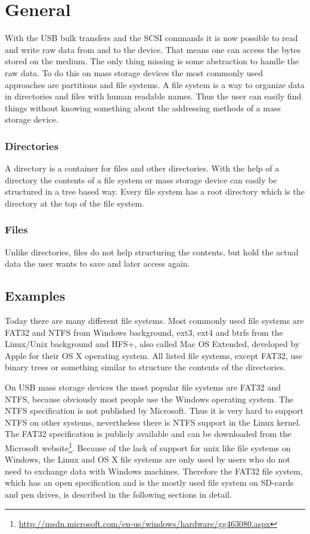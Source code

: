 \section{General}

With the USB bulk transfers and the SCSI commands it is now possible to read and write raw data from and to the device. That means one can access the bytes stored on the medium. The only thing missing is some abstraction to handle the raw data. To do this on mass storage devices the most commonly used approaches are partitions and file systems. A file system is a way to organize data in directories and files with human readable names. Thus the user can easily find things without knowing something about the addressing methods of a mass storage device.

\subsubsection{Directories}

A directory is a container for files and other directories. With the help of a directory the contents of a file system or mass storage device can easily be structured in a tree based way. Every file system has a root directory which is the directory at the top of the file system.

\subsubsection{Files}

Unlike directories, files do not help structuring the contents, but hold the actual data the user wants to save and later access again.

\subsection{Examples}

Today there are many different file systems. Most commonly used file systems are FAT32 and NTFS from Windows background, ext3, ext4 and btrfs from the Linux/Unix background and HFS+, also called Mac OS Extended, developed by Apple for their OS X operating system. All listed file systems, except FAT32, use binary trees or something similar to structure the contents of the directories.

On USB mass storage devices the most popular file systems are FAT32 and NTFS, because obviously most people use the Windows operating system. The NTFS specification is not published by Microsoft. Thus it is very hard to support NTFS on other systems, nevertheless there is NTFS support in the Linux kernel. The FAT32 specification is publicly available and can be downloaded from the Microsoft website\footnote{\url{http://msdn.microsoft.com/en-us/windows/hardware/gg463080.aspx}}. Because of the lack of support for unix like file systems on Windows, the Linux and OS X file systems are only used by users who do not need to exchange data with Windows machines. Therefore the FAT32 file system, which has an open specification and is the mostly used file system on SD-cards and pen drives, is described in the following sections in detail.

